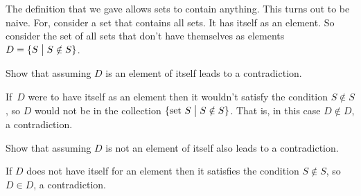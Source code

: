 \documentclass{ibl}  %
\begin{document}
\begin{problem}[\maxlength] 
The definition that we gave allows sets to contain anything.
This turns out to be naive. 
For, consider a set that contains all sets.
It has itself as an element.
So
consider the set of all sets that don't have themselves as 
elements~$D=\{S \bigm| S\notin S\}$.
\begin{exes}
\begin{exercise} 
  Show that assuming $D$ is an element of itself leads to a contradiction.
\end{exercise}
\begin{answer}
  If~$D$ were to have itself as an element 
  then it wouldn't satisfy the condition
  $S\notin S$, so $D$ would not be in the collection 
  $\{\text{set~$S$} \bigm| S\notin S\}$.
  That is, in this case $D\notin D$, a contradiction.   
\end{answer}
\begin{exercise} 
  Show that assuming $D$ is not an element of itself also leads to a
  contradiction.  
\end{exercise}
\begin{answer}
  If $D$ does not have itself for an element then it satisfies the
  condition $S\notin S$, so $D\in D$, a contradiction.  
\end{answer}
\end{exes}
\end{problem}
\end{document}
